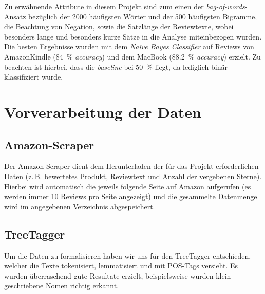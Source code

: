 \documentclass[a4paper]{article}
\begin{document}
Zu erwähnende Attribute in diesem Projekt sind zum einen der \emph{bag-of-words}-Ansatz bezüglich der 2000 häufigsten Wörter und der 500 häufigsten Bigramme, die Beachtung von Negation, sowie die Satzlänge der Reviewtexte, wobei besonders lange und besonders kurze Sätze in die Analyse miteinbezogen wurden. Die besten Ergebnisse wurden mit dem \emph{Naïve Bayes Classifier} auf Reviews von AmazonKindle (\SI{84}{\%} \emph{accuracy}) und dem MacBook (\SI{88.2}{\%} \emph{accuracy}) erzielt. Zu beachten ist hierbei, dass die \emph{baseline} bei \SI{50}{\%} liegt, da lediglich binär klassifiziert wurde.  


\section{Vorverarbeitung der Daten}




\subsection{Amazon-Scraper}

Der Amazon-Scraper dient dem Herunterladen der für das Projekt erforderlichen Daten (z.\,B. bewertetes Produkt, Reviewtext und Anzahl der vergebenen Sterne). Hierbei wird automatisch die jeweils folgende Seite auf Amazon aufgerufen (es werden immer 10 Reviews pro Seite angezeigt) und die gesammelte Datenmenge wird im angegebenen Verzeichnis abgespeichert.




\subsection{TreeTagger}

Um die Daten zu formalisieren haben wir uns für den TreeTagger entschieden, welcher die Texte tokenisiert, lemmatisiert und mit POS-Tags versieht. Es wurden überraschend gute Resultate erzielt, beispielsweise wurden klein geschriebene Nomen richtig erkannt.


\end{document}
